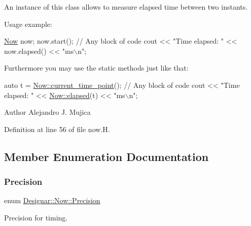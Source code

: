 An instance of this class allows to measure elapsed time between two instants.

Usage example\+: 
\begin{DoxyCode}
\hyperlink{class_designar_1_1_now_ad96b225953507a5a7853aef2c6b30641}{Now} now;
now.start();
\textcolor{comment}{// Any block of code}
cout << \textcolor{stringliteral}{"Time elapsed: "} << now.elapsed() << \textcolor{stringliteral}{"ms\(\backslash\)n"};
\end{DoxyCode}


Furthermore you may use the static methods just like that\+: 
\begin{DoxyCode}
\textcolor{keyword}{auto} t = \hyperlink{class_designar_1_1_now_af862bb15a2202e02e31a1d11fac08dcf}{Now::current\_time\_point}();
\textcolor{comment}{// Any block of code}
cout << \textcolor{stringliteral}{"Time elapsed: "} << \hyperlink{class_designar_1_1_now_a3219d85172fc9628ef90f66c1d69a8e0}{Now::elapsed}(t) << \textcolor{stringliteral}{"ms\(\backslash\)n"};
\end{DoxyCode}


\begin{DoxyAuthor}{Author}
Alejandro J. Mujica 
\end{DoxyAuthor}


Definition at line 56 of file now.\+H.



\subsection{Member Enumeration Documentation}
\mbox{\label{class_designar_1_1_now_a3c9f5e57907c88cbe63c70a64638c072}} 
\subsubsection{\texorpdfstring{Precision}{Precision}}
{\footnotesize\ttfamily enum \hyperlink{class_designar_1_1_now_a3c9f5e57907c88cbe63c70a64638c072}{Designar\+::\+Now\+::\+Precision}\hspace{0.3cm}{\ttfamily [strong]}}



Precision for timing. 

